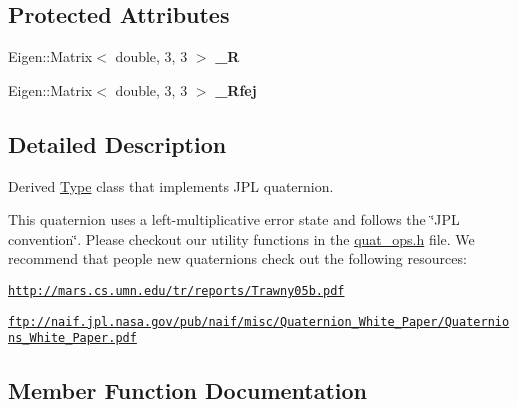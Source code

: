 \subsection*{Protected Attributes}
\begin{DoxyCompactItemize}
\item 
\mbox{\label{classov__type_1_1JPLQuat_a96c5f21fbff5ba2ecd0e9daf05a24765}} 
Eigen\+::\+Matrix$<$ double, 3, 3 $>$ {\bfseries \+\_\+R}
\item 
\mbox{\label{classov__type_1_1JPLQuat_aa87a66b60ae150c0006fed0559787644}} 
Eigen\+::\+Matrix$<$ double, 3, 3 $>$ {\bfseries \+\_\+\+Rfej}
\end{DoxyCompactItemize}


\subsection{Detailed Description}
Derived \hyperlink{classov__type_1_1Type}{Type} class that implements J\+PL quaternion. 

This quaternion uses a left-\/multiplicative error state and follows the \char`\"{}\+J\+P\+L convention\char`\"{}. Please checkout our utility functions in the \hyperlink{quat__ops_8h_source}{quat\+\_\+ops.\+h} file. We recommend that people new quaternions check out the following resources\+:
\begin{DoxyItemize}
\item \href{http://mars.cs.umn.edu/tr/reports/Trawny05b.pdf}{\tt http\+://mars.\+cs.\+umn.\+edu/tr/reports/\+Trawny05b.\+pdf}
\item \href{ftp://naif.jpl.nasa.gov/pub/naif/misc/Quaternion_White_Paper/Quaternions_White_Paper.pdf}{\tt ftp\+://naif.\+jpl.\+nasa.\+gov/pub/naif/misc/\+Quaternion\+\_\+\+White\+\_\+\+Paper/\+Quaternions\+\_\+\+White\+\_\+\+Paper.\+pdf} 
\end{DoxyItemize}

\subsection{Member Function Documentation}
\mbox{\label{classov__type_1_1JPLQuat_ae631d6cf4ed4170234272be498fd22e3}} 
